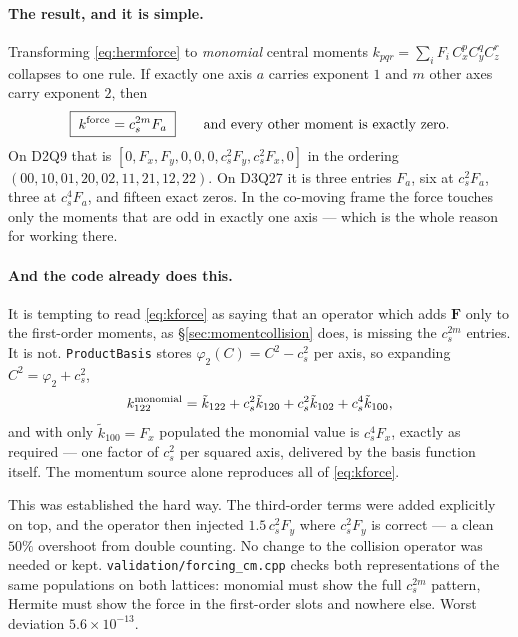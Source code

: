 \documentclass[11pt,a4paper]{article}
\newcommand{\code}[1]{\texttt{\small #1}}
\newcommand{\cs}{c_s}
\newcommand{\e}[1]{\times 10^{#1}}
\begin{document}
\paragraph{The result, and it is simple.} Transforming \eqref{eq:hermforce} to
\emph{monomial} central moments $k_{pqr}=\sum_i F_i\,C_x^pC_y^qC_z^r$ collapses
to one rule. If exactly one axis $a$ carries exponent $1$ and $m$ other axes
carry exponent $2$, then
\begin{equation}
  \boxed{\;k^{\rm force} = \cs^{2m} F_a\;}
  \qquad\text{and every other moment is exactly zero.}
  \label{eq:kforce}
\end{equation}
On D2Q9 that is $[0,F_x,F_y,0,0,0,\cs^2F_y,\cs^2F_x,0]$ in the ordering
$(00,10,01,20,02,11,21,12,22)$. On D3Q27 it is three entries $F_a$, six at
$\cs^2F_a$, three at $\cs^4F_a$, and fifteen exact zeros. In the co-moving frame
the force touches only the moments that are odd in exactly one axis --- which is
the whole reason for working there.

\paragraph{And the code already does this.} It is tempting to read
\eqref{eq:kforce} as saying that an operator which adds $\bm F$ only to the
first-order moments, as \S\ref{sec:momentcollision} does, is missing the
$\cs^{2m}$ entries. It is not. \code{ProductBasis} stores
$\varphi_2(C) = C^2-\cs^2$ per axis, so expanding $C^2 = \varphi_2 + \cs^2$,
\begin{equation}
  k_{122}^{\rm monomial}
    = \tilde k_{122} + \cs^2\tilde k_{120} + \cs^2\tilde k_{102}
      + \cs^4\tilde k_{100},
\end{equation}
and with only $\tilde k_{100}=F_x$ populated the monomial value is $\cs^4F_x$,
exactly as required --- one factor of $\cs^2$ per squared axis, delivered by the
basis function itself. The momentum source alone reproduces all of
\eqref{eq:kforce}.

This was established the hard way. The third-order terms were added explicitly
on top, and the operator then injected $1.5\,\cs^2F_y$ where $\cs^2F_y$ is
correct --- a clean $50\%$ overshoot from double counting. No change to the
collision operator was needed or kept.
\code{validation/forcing\_cm.cpp} checks both representations of the same
populations on both lattices: monomial must show the full $\cs^{2m}$ pattern,
Hermite must show the force in the first-order slots and nowhere else. Worst
deviation $5.6\e{-13}$.
\end{document}
